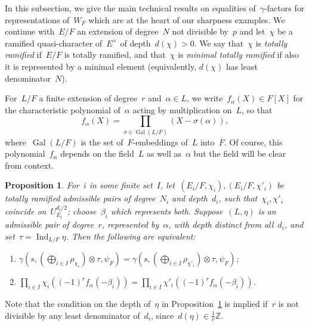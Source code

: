\documentclass[12pt]{amsart}
\newcommand{\Gal}{\operatorname{Gal}}
\newcommand{\Ind}{\operatorname{Ind}}
\newcommand{\val}{\operatorname{val}}
\newtheorem{prop}[thm]{Proposition}
\newtheorem{prop}[equation]{Proposition}
\begin{document}
In this subsection, we give the main technical results on equalities of~$\gamma$-factors for representations of~$W_F$ which are at the heart of our sharpness examples. We continue with~$E/F$ an extension of degree~$N$ not divisible by~$p$ and let~$\chi$ be a ramified quasi-character of~$E^\times$ of depth~$d(\chi)> 0$. We say that~$\chi$ is \emph{totally ramified} if~$E/F$ is totally ramified, and that~$\chi$ is \emph{minimal totally ramified} if also it is represented by a minimal element (equivalently, $d(\chi)$ has least denominator~$N$).

For~$L/F$ a finite extension of degree~$r$ and~$\alpha\in L$, we write~$f_\alpha(X)\in F[X]$ for the characteristic polynomial of~$\alpha$ acting by multiplication on~$L$, so that
\[
f_\alpha(X) = \prod_{\sigma\in\Gal(L/F)} (X-\sigma(\alpha)),
\]
where~$\Gal(L/F)$ is the set of~$F$-embeddings of~$L$ into~$\overline{F}$. Of course, this polynomial~$f_\alpha$ depends on the field~$L$ as well as~$\alpha$ but the field will be clear from context. 

\begin{prop}\label{prop:basic}
For~$i$ in some finite set~$I$, let~$(E_i/F,\chi_i),(E_i/F,\chi'_i)$ be totally ramified admissible pairs of degree~$N_i$ and depth~$d_i$, such that~$\chi_i,\chi'_i$ coincide on~$U^{d_i/2}_{E_i}$; choose~$\beta_i$ which represents both. Suppose~$(L,\eta)$ is an admissible pair of degree~$r$, represented by~$\alpha$, with depth distinct from all~$d_i$, and set~$\tau=\Ind_{L/F}\eta$. Then the following are equivalent:
\begin{enumerate}
\item\label{prop:basic.i} $\gamma(s,(\bigoplus\limits_{i\in I}\rho_{\chi_i})\otimes\tau,\psi_F)=\gamma(s,(\bigoplus\limits_{i\in I}\rho_{\chi'_i})\otimes\tau,\psi_F)$;
\item $\prod\limits_{i\in I} \chi_i((-1)^r f_\alpha(-\beta_i)) = \prod\limits_{i\in I} \chi'_i((-1)^r f_\alpha(-\beta_i))$.
\end{enumerate}
\end{prop}
Note that the condition on the depth of~$\eta$ in Proposition~\ref{prop:basic} is implied if~$r$ is not divisible by any least denominator of~$d_i$, since~$d(\eta)\in\frac 1r\mathbb{Z}$. 
\end{document}
